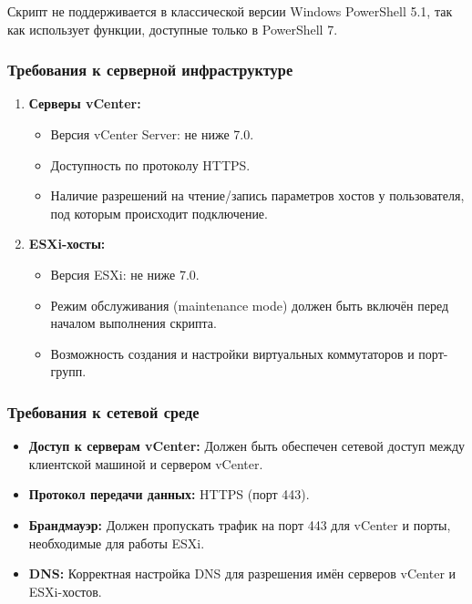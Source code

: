 Скрипт не поддерживается в классической версии Windows PowerShell 5.1, так как использует функции, доступные только в PowerShell 7.

\subsubsection{Требования к серверной инфраструктуре}
\begin{enumerate}
    \item \textbf{Серверы vCenter:}
    \begin{itemize}
        \item Версия vCenter Server: не ниже 7.0.
        \item Доступность по протоколу HTTPS.
        \item Наличие разрешений на чтение/запись параметров хостов у пользователя, под которым происходит подключение.
    \end{itemize}
    
    \item \textbf{ESXi-хосты:}
    \begin{itemize}
        \item Версия ESXi: не ниже 7.0.
        \item Режим обслуживания (maintenance mode) должен быть включён перед началом выполнения скрипта.
        \item Возможность создания и настройки виртуальных коммутаторов и порт-групп.
    \end{itemize}
\end{enumerate}

\subsubsection{Требования к сетевой среде}
\begin{itemize}
    \item \textbf{Доступ к серверам vCenter:} Должен быть обеспечен сетевой доступ между клиентской машиной и сервером vCenter.
    \item \textbf{Протокол передачи данных:} HTTPS (порт 443).
    \item \textbf{Брандмауэр:} Должен пропускать трафик на порт 443 для vCenter и порты, необходимые для работы ESXi.
    \item \textbf{DNS:} Корректная настройка DNS для разрешения имён серверов vCenter и ESXi-хостов.
\end{itemize}

